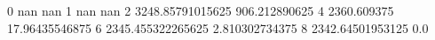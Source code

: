0 nan nan
1 nan nan
2 3248.85791015625 906.212890625
4 2360.609375 17.96435546875
6 2345.455322265625 2.810302734375
8 2342.64501953125 0.0
